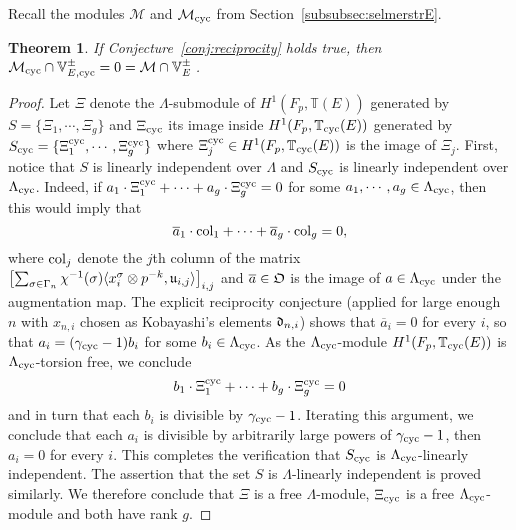 \documentclass[12pt]{amsart}
\numberwithin{equation}{section}
\newtheorem{thm}{Theorem}[section]
\begin{document}
 
Recall the modules $\mathcal{M}$ and $\mathcal{M}_{\textup{cyc}}$ from Section~\ref{subsubsec:selmerstrE}.
\begin{thm}
\label{thm:transversepm}
If Conjecture~\ref{conj:reciprocity} holds true, then
$\mathcal{M}_{\textup{cyc}} \cap  \mathbb{V}^\pm_{E,{\textup{cyc}}}=0=\mathcal{M}\cap \mathbb{V}^\pm_E$\,.
\end{thm}
\begin{proof}
Let $\Xi$ denote the ${\Lambda}$-submodule of $H^1(F_p,{\mathbb{T}}(E))$ generated by $S=\{{\Xi}_1,\cdots,{\Xi}_g\}$ and $\Xi_{\textup{cyc}}$ its image inside $H^1(F_p,{\mathbb{T}}_{\textup{cyc}}(E))$ generated by $S_{\textup{cyc}}=\{{\Xi}_1^{\textup{cyc}},\cdots,{\Xi}_g^{\textup{cyc}}\}$ where $\Xi_j^{\textup{cyc}}\in H^1(F_p,{\mathbb{T}}_{\textup{cyc}}(E))$ is the image of $\Xi_j$. First, notice that $S$ is linearly independent over ${\Lambda}$ and $S_{\textup{cyc}}$ is linearly independent over ${\Lambda}_{\textup{cyc}}$. Indeed, if $a_1\cdot{\Xi}_1^{\textup{cyc}} +\cdots+a_g\cdot{\Xi}_g^{\textup{cyc}}=0$ for some $a_1,\cdots,a_g\in {\Lambda}_{\textup{cyc}}$, then this would imply that 
$$\overline{a}_1\cdot\textup{col}_1+\cdots + \overline{a}_g\cdot\textup{col}_g=0,$$
where $\textup{col}_j$ denote the $j$th column of the matrix $\left[\sum_{\sigma\in \Gamma_n}\chi^{-1}(\sigma)\langle x_i^\sigma\otimes p^{-k},\frak{u}_{i,j}\rangle\right]_{i,j}$ and $\overline{a} \in {\frak{O}}$ is the image of $a \in {\Lambda}_{\textup{cyc}}$ under the augmentation map. The explicit reciprocity conjecture (applied for large enough $n$ with $x_{n,i}$ chosen as Kobayashi's elements $\frak{d}_{n,i}$) shows that $\overline{a}_i=0$ for every $i$, so that $a_i=(\gamma_{\textup{cyc}}-1)b_i$ for some $b_i \in {\Lambda}_{\textup{cyc}}$. As the ${\Lambda}_{\textup{cyc}}$-module  $H^1(F_p,{\mathbb{T}}_{\textup{cyc}}(E))$ is ${\Lambda}_{\textup{cyc}}$-torsion free, we conclude
$$b_1\cdot{\Xi}_1^{\textup{cyc}} +\cdots+b_g\cdot{\Xi}_g^{\textup{cyc}}=0$$
and in turn that each $b_i$ is divisible by $\gamma_{\textup{cyc}}-1$. Iterating this argument, we conclude that each $a_i$ is divisible by arbitrarily large powers of $\gamma_{\textup{cyc}}-1$, then $a_i=0$ for every $i$. This completes the verification that $S_{\textup{cyc}}$ is ${\Lambda}_{\textup{cyc}}$-linearly independent. The assertion that the set $S$ is ${\Lambda}$-linearly independent is proved similarly. We therefore conclude that $\Xi$ is a free ${\Lambda}$-module, $\Xi_{\textup{cyc}}$ is a free ${\Lambda}_{\textup{cyc}}$-module and both have rank $g$.


\end{proof}
\end{document}
